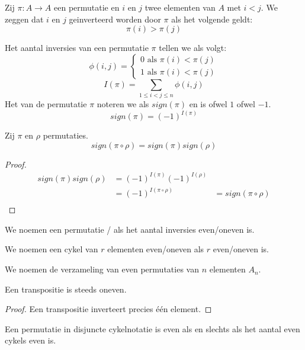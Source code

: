\documentclass[main.tex]{subfiles}
\begin{document}
\begin{de}
  Zij $\pi: A \rightarrow A$ een permutatie en $i$ en $j$ twee elementen van $A$ met $i < j$.
  We zeggen dat $i$ en $j$ geinverteerd worden door $\pi$ als het volgende geldt:
  \[ \pi(i) > \pi(j) \]
\end{de}

\begin{de}
  Het aantal inversies van een permutatie $\pi$ tellen we als volgt:
  \[
  \phi(i,j) =
  \left\{
  \begin{array}{lc}
    0 \text{ als } \pi(i) < \pi(j)\\
    1 \text{ als } \pi(i) < \pi(j)
  \end{array}
  \right.
  \]
  \[ I(\pi) = \sum_{1\le i < j \le n}\phi(i,j) \]
  Het  van de permutatie $\pi$ noteren we als $sign(\pi)$ en is ofwel $1$ ofwel $-1$.
  \[ sign(\pi) = (-1)^{I(\pi)}\] 
\end{de}

\begin{ei}
  \label{ei:samenstelling-permutaties-teken}
  Zij $\pi$ en $\rho$ permutaties.
  \[ sign(\pi\circ\rho) = sign(\pi)sign(\rho) \] 
  \begin{proof}
    \[
    \begin{array}{rll}
      sign(\pi)sign(\rho) &= (-1)^{I(\pi)} (-1)^{I(\rho)} &\\
                          &= (-1)^{I(\pi\circ\rho)}      &=sign(\pi\circ\rho)\\
    \end{array}
    \]
  \end{proof}
\end{ei}

\begin{de}
  We noemen een permutatie / als het aantal inversies even/oneven is.
\end{de}

\begin{de}
  We noemen een cykel van $r$ elementen even/oneven als $r$ even/oneven is.
\end{de}

\begin{de}
  \label{de:even-permutaties}
  We noemen de verzameling van even permutaties van $n$ elementen $A_{n}$.
\end{de}

\begin{st}
  Een transpositie is steeds oneven.
  \begin{proof}
    Een transpositie inverteert precies \'e\'en element.
  \end{proof}
\end{st}

\begin{st}
  \label{st:even-asa-aantal-even-cykels-even}
  Een permutatie in disjuncte cykelnotatie is even als en slechts als het aantal even cykels even is.

\end{st}
\end{document}
